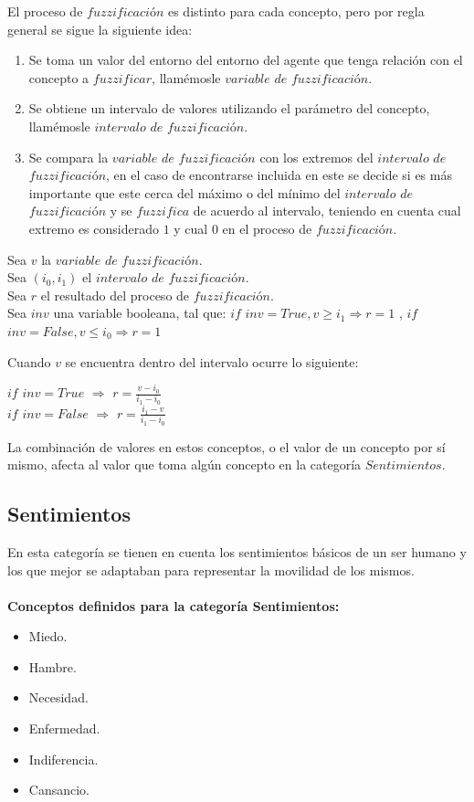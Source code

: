 El proceso de $fuzzificaci$ó$n$ es distinto para cada concepto, pero por regla general se sigue la siguiente idea:\\
\begin{enumerate}
    \item Se toma un valor del entorno del entorno del agente que tenga relación con el concepto a $fuzzificar$, llamémosle $variable$ $de$ $fuzzificaci$ó$n$.
    \item Se obtiene un intervalo de valores utilizando el parámetro del concepto, llamémosle $intervalo$ $de$ $fuzzificaci$ó$n$.
    \item Se compara la $variable$ $de$ $fuzzificaci$ó$n$ con los extremos del $intervalo$ $de$ $fuzzificaci$ó$n$, en el caso de encontrarse incluida en este se decide si es más importante que este cerca del máximo o del mínimo del $intervalo$ $de$ $fuzzificaci$ó$n$ y se $fuzzifica$ de acuerdo al intervalo, teniendo en cuenta cual extremo es considerado $1$ y cual $0$ en el proceso de $fuzzificaci$ó$n$.
\end{enumerate}

\begin{center}
    Sea $v$ la $variable$ $de$ $fuzzificaci$ó$n$.\\
    Sea $(i_0, i_1)$ el $intervalo$ $de$ $fuzzificaci$ó$n$.\\
    Sea $r$ el resultado del proceso de $fuzzificaci$ó$n$.\\
    Sea $inv$ una variable booleana, tal que: $if$ $inv = True, v \geq i_1 \Rightarrow r = 1$ , $if$ $inv = False, v \leq i_0 \Rightarrow r = 1$\\
\end{center}
    Cuando $v$ se encuentra dentro del intervalo ocurre lo siguiente:
\begin{center}
    $if$ $inv = True$ $\Rightarrow$ $r = \frac{v - i_0}{i_1 - i_0}$\\
    $if$ $inv = False$ $\Rightarrow$ $r = \frac{i_1 - v}{i_1 - i_0}$
\end{center}

La combinación de valores en estos conceptos, o el valor de un concepto por sí mismo, afecta al valor que toma algún
concepto en la categoría $Sentimientos$.\\

\subsection{Sentimientos}
En esta categoría se tienen en cuenta los sentimientos básicos de un ser humano y los que mejor se adaptaban para
representar la movilidad de los mismos.\\
\\
\textbf{Conceptos definidos para la categoría Sentimientos:}
\begin{itemize}
    \item Miedo.
    \item Hambre.
    \item Necesidad.
    \item Enfermedad.
    \item Indiferencia.
    \item Cansancio.
\end{itemize}

